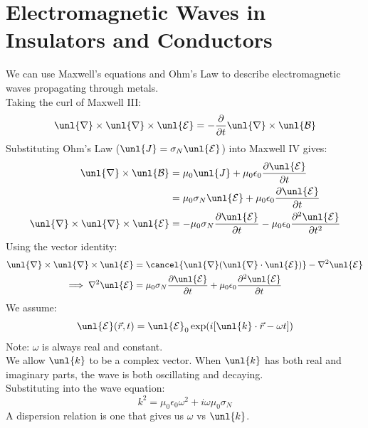 \documentclass[a4paper, 11pt, normalem]{report}
\newcommand\p{\partial}
\newcommand\E{\mathcal{E}}
\newcommand\uE{\unl{\E}}
\newcommand\B{\mathcal{B}}
\newcommand\uB{\unl{\B}}
\newcommand\del{\unl{\nabla}}
\newcommand\eno{\epsilon_0}
\newcommand\vk{\unl{k}}
\newcommand\J{\unl{J}}
\begin{document}
\section{Electromagnetic Waves in Insulators and Conductors}
We can use Maxwell's equations and Ohm's Law to describe electromagnetic waves propagating through metals. \\
Taking the curl of Maxwell \RN{3}:
\begin{equation}
    \del \times \del \times \uE = -\frac{\p}{\p t}\del \times \uB
\end{equation}
Substituting Ohm's Law ($\J = \sigma_N\uE$) into Maxwell \RN{4} gives:
\begin{align}
    \del\times\uB &= \mu_0\J + \mu_0\eno\frac{\p \uE}{\p t} \\
    &= \mu_0\sigma_N\uE + \mu_0\eno\frac{\p\uE}{\p t} \\
    \del \times \del \times \uE &= -\mu_0\sigma_N\frac{\p\uE}{\p t} - \mu_0\eno\frac{\p^2\uE}{\p t^2}
\end{align}
Using the vector identity:
\begin{align}
    \del\times\del\times\uE &= \cancel{\del(\del\cdot\uE)} - \nabla^2\uE \\
    \implies \nabla^2\uE &= \mu_0\sigma_N\frac{\p\uE}{\p t} + \mu_0\eno\frac{\p^2\uE}{\p t}
\end{align}
We assume:
\begin{equation}
    \uE(\vec{r},t) = \uE_0\exp(i[\vk\cdot\vec{r}-\omega t])
\end{equation}
Note: $\omega$ is always real and constant. \\
We allow $\vk$ to be a complex vector.
When $\vk$ has both real and imaginary parts, the wave is both oscillating and decaying. \\
Substituting into the wave equation:
\begin{equation}
    k^2 = \mu_0\eno\omega^2 + i\omega\mu_0\sigma_N \tag{Dispersion Relation}
\end{equation}
A dispersion relation is one that gives us $\omega$ vs $\vk$.
\end{document}
